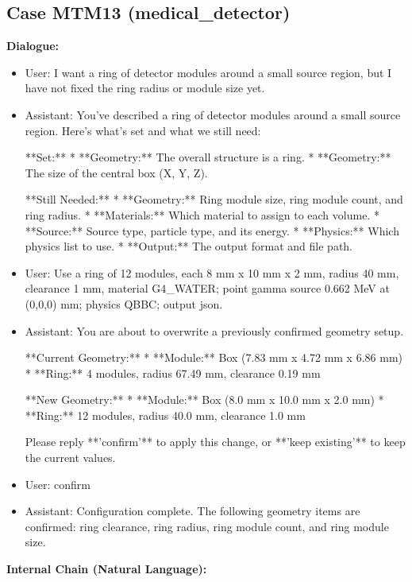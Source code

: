 \documentclass[11pt]{ctexart}
\begin{document}
\subsection{Case MTM13 (medical\_detector)}
\textbf{Dialogue:}
\begin{itemize}
\item User: I want a ring of detector modules around a small source region, but I have not fixed the ring radius or module size yet.
\item Assistant: You've described a ring of detector modules around a small source region. Here's what's set and what we still need:

**Set:**
*   **Geometry:** The overall structure is a ring.
*   **Geometry:** The size of the central box (X, Y, Z).

**Still Needed:**
*   **Geometry:** Ring module size, ring module count, and ring radius.
*   **Materials:** Which material to assign to each volume.
*   **Source:** Source type, particle type, and its energy.
*   **Physics:** Which physics list to use.
*   **Output:** The output format and file path.
\item User: Use a ring of 12 modules, each 8 mm x 10 mm x 2 mm, radius 40 mm, clearance 1 mm, material G4\_WATER; point gamma source 0.662 MeV at (0,0,0) mm; physics QBBC; output json.
\item Assistant: You are about to overwrite a previously confirmed geometry setup.

**Current Geometry:**
*   **Module:** Box (7.83 mm x 4.72 mm x 6.86 mm)
*   **Ring:** 4 modules, radius 67.49 mm, clearance 0.19 mm

**New Geometry:**
*   **Module:** Box (8.0 mm x 10.0 mm x 2.0 mm)
*   **Ring:** 12 modules, radius 40.0 mm, clearance 1.0 mm

Please reply **'confirm'** to apply this change, or **'keep existing'** to keep the current values.
\item User: confirm
\item Assistant: Configuration complete. The following geometry items are confirmed: ring clearance, ring radius, ring module count, and ring module size.
\end{itemize}
\textbf{Internal Chain (Natural Language):}
\end{document}
